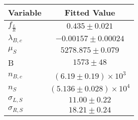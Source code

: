 \begin{tabular}[t]{lc}
\hline
Variable &Fitted Value\\
\hline\hline
$f_{\frac{L}{R}}$&$0.435\pm0.021$\\
\hline
$\lambda_{B,c}$&$-0.00157\pm0.00024$\\
\hline
$\mu_S$&$5278.875\pm0.079$\\
\hline
B&$1573\pm48$\\
\hline
$n_{B,c}$&$(6.19\pm0.19)\times 10^3$\\
\hline
$n_S$&$(5.136\pm0.028)\times 10^4$\\
\hline
$\sigma_{L, S}$&$11.00\pm0.22$\\
\hline
$\sigma_{R, S}$&$18.21\pm0.24$\\
\hline
\end{tabular}
